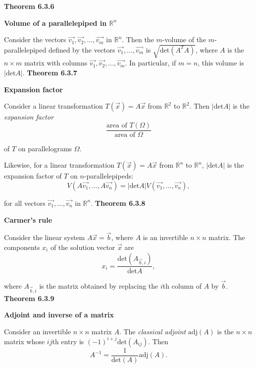 \textbf{Theorem 6.3.6}\\
\par\noindent\textbf{Volume of a parallelepiped in $\mathbb{R}^{n}$}
\par\noindent Consider the vectors $\vec{v_{1}},\vec{v_{2}},\ldots{},\vec{v_{m}}$ in $\mathbb{R}^{n}$. Then the $m$-volume of the $m$-parallelepiped defined by the vectors $\vec{v_{1}},\ldots{},\vec{v_{m}}$ is $\sqrt{\textrm{det}(A^{T}A)}$, where $A$ is the $n\times{}m$ matrix with columns $\vec{v_{1}},\vec{v_{2}},\ldots{},\vec{v_{m}}$. In particular, if $m=n$, this volume is $|\textrm{det}A|$.
\textbf{Theorem 6.3.7}\\
\par\noindent\textbf{Expansion factor}
\par\noindent Consider a linear transformation $T(\vec{x})=A\vec{x}$ from $\mathbb{R}^{2}$ to $\mathbb{R}^{2}$. Then $|\textrm{det}A|$ is the \textit{expansion factor}
\[\frac{\textrm{area of }T(\Omega{})}{\textrm{area of }\Omega{}}\]
\par\noindent of $T$ on parallelograms $\Omega{}$.
\par\noindent Likewise, for a linear transformation $T(\vec{x})=A\vec{x}$ from $\mathbb{R}^{n}$ to $\mathbb{R}^{n}$, $|\textrm{det}A|$ is the expansion factor of $T$ on $n$-parallelepipeds:
\[V(A\vec{v_{1}},\ldots{},A\vec{v_{n}})=|\textrm{det}A|V(\vec{v_{1}},\ldots{},\vec{v_{n}}),\]
\par\noindent for all vectors $\vec{v_{1}},\ldots{},\vec{v_{n}}$ in $\mathbb{R}^{n}$.
\textbf{Theorem 6.3.8}\\
\par\noindent\textbf{Carmer's rule}
\par\noindent Consider the linear system $A\vec{x}=\vec{b}$, where $A$ is an invertible $n\times{}n$ matrix. The components $x_{i}$ of the solution vector $\vec{x}$ are
\[x_{i}=\frac{\textrm{det}(A_{\vec{b},i})}{\textrm{det}A},\]
\par\noindent where $A_{\vec{b},i}$ is the matrix obtained by replacing the $i$th column of $A$ by $\vec{b}$.
\textbf{Theorem 6.3.9}\\
\par\noindent\textbf{Adjoint and inverse of a matrix}
\par\noindent Consider an invertible $n\times{}n$ matrix $A$. The \textit{classical adjoint} $\textrm{adj}(A)$ is the $n\times{}n$ matrix whose $ij$th entry is $(-1)^{i+j}\textrm{det}(A_{ij})$. Then
\[A^{-1}=\frac{1}{\textrm{det}(A)}\textrm{adj}(A).\]

